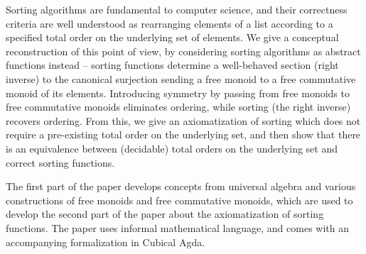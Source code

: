 Sorting algorithms are fundamental to computer science, and their correctness
criteria are well understood as rearranging elements of a list
according to a specified total order on the underlying set of elements.
We give a conceptual reconstruction of this point of view, by considering
sorting algorithms as abstract functions instead -- sorting functions determine a
well-behaved section (right inverse) to the canonical surjection sending a free
monoid to a free commutative monoid of its elements.
Introducing symmetry by passing from free monoids to free commutative monoids
eliminates ordering, while sorting (the right inverse) recovers ordering.
From this, we give an axiomatization of sorting which does not require a
pre-existing total order on the underlying set, and then show that there is an
equivalence between (decidable) total orders on the underlying set and correct
sorting functions.

The first part of the paper develops concepts from universal algebra and various
constructions of free monoids and free commutative monoids, which are used to
develop the second part of the paper about the axiomatization of sorting
functions.
The paper uses informal mathematical language, and comes with an accompanying
formalization in Cubical Agda.

